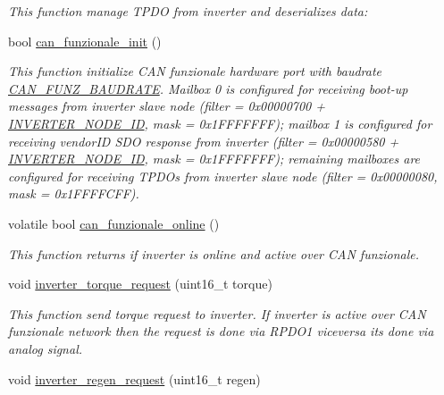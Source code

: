 \begin{DoxyCompactItemize}
\begin{DoxyCompactList}\small\item\em This function manage T\+P\+DO from inverter and deserializes data\+: \end{DoxyCompactList}\item 
bool \mbox{\hyperlink{group___c_a_n__funzionale__group_ga578b28192b0c78942fcc0452d070accb}{can\+\_\+funzionale\+\_\+init}} ()
\begin{DoxyCompactList}\small\item\em This function initialize C\+AN funzionale hardware port with baudrate \mbox{\hyperlink{group___common__defines__group_gadee7e3800c996a5a977034531d94570d}{C\+A\+N\+\_\+\+F\+U\+N\+Z\+\_\+\+B\+A\+U\+D\+R\+A\+TE}}. Mailbox 0 is configured for receiving boot-\/up messages from inverter slave node (filter = 0x00000700 + \mbox{\hyperlink{group___c_a_n__funzionale__group_ga59ea82aec4abe07072cbdad555a8c1b9}{I\+N\+V\+E\+R\+T\+E\+R\+\_\+\+N\+O\+D\+E\+\_\+\+ID}}, mask = 0x1\+F\+F\+F\+F\+F\+FF); mailbox 1 is configured for receiving vendor\+ID S\+DO response from inverter (filter = 0x00000580 + \mbox{\hyperlink{group___c_a_n__funzionale__group_ga59ea82aec4abe07072cbdad555a8c1b9}{I\+N\+V\+E\+R\+T\+E\+R\+\_\+\+N\+O\+D\+E\+\_\+\+ID}}, mask = 0x1\+F\+F\+F\+F\+F\+FF); remaining mailboxes are configured for receiving T\+P\+D\+Os from inverter slave node (filter = 0x00000080, mask = 0x1\+F\+F\+F\+F\+C\+FF). \end{DoxyCompactList}\item 
volatile bool \mbox{\hyperlink{group___c_a_n__funzionale__group_ga7d74fd826c5df3b86fd751f91c61671f}{can\+\_\+funzionale\+\_\+online}} ()
\begin{DoxyCompactList}\small\item\em This function returns if inverter is online and active over C\+AN funzionale. \end{DoxyCompactList}\item 
void \mbox{\hyperlink{group___c_a_n__funzionale__group_ga41854ab275f2b3cb7efb9385502d7d65}{inverter\+\_\+torque\+\_\+request}} (uint16\+\_\+t torque)
\begin{DoxyCompactList}\small\item\em This function send torque request to inverter. If inverter is active over C\+AN funzionale network then the request is done via R\+P\+D\+O1 viceversa it\textquotesingle{}s done via analog signal. \end{DoxyCompactList}\item 
void \mbox{\hyperlink{group___c_a_n__funzionale__group_ga75820e0d72b7f264a70d99f414745518}{inverter\+\_\+regen\+\_\+request}} (uint16\+\_\+t regen)

\end{DoxyCompactItemize}
